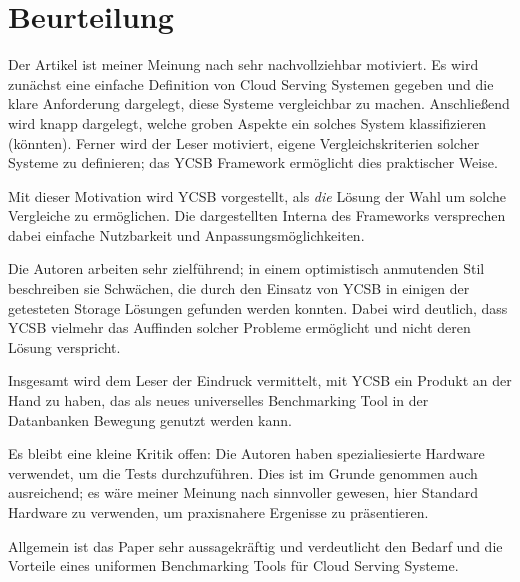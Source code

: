 \section{Beurteilung}

Der Artikel ist meiner Meinung nach sehr nachvollziehbar motiviert. Es wird zunächst eine einfache Definition von Cloud Serving Systemen gegeben und die klare Anforderung dargelegt, diese Systeme vergleichbar zu machen. Anschließend wird knapp dargelegt, welche groben Aspekte ein solches System klassifizieren (könnten). Ferner wird der Leser motiviert, eigene Vergleichskriterien solcher Systeme zu definieren; das YCSB Framework ermöglicht dies praktischer Weise.

Mit dieser Motivation wird YCSB vorgestellt, als \textit{die} Lösung der Wahl um solche Vergleiche zu ermöglichen. Die dargestellten Interna des Frameworks versprechen dabei einfache Nutzbarkeit und Anpassungsmöglichkeiten.

Die Autoren arbeiten sehr zielführend; in einem optimistisch anmutenden Stil beschreiben sie Schwächen, die durch den Einsatz von YCSB in einigen der getesteten Storage Lösungen gefunden werden konnten. Dabei wird deutlich, dass YCSB vielmehr das Auffinden solcher Probleme ermöglicht und nicht deren Lösung verspricht.

Insgesamt wird dem Leser der Eindruck vermittelt, mit YCSB ein Produkt an der Hand zu haben, das als neues universelles Benchmarking Tool in der Datanbanken Bewegung genutzt werden kann.

Es bleibt eine kleine Kritik offen: Die Autoren haben spezialiesierte Hardware verwendet, um die Tests durchzuführen. Dies ist im Grunde genommen auch ausreichend; es wäre meiner Meinung nach sinnvoller gewesen, hier Standard Hardware zu verwenden, um praxisnahere Ergenisse zu präsentieren.

Allgemein ist das Paper sehr aussagekräftig und verdeutlicht den Bedarf und die Vorteile eines uniformen Benchmarking Tools für Cloud Serving Systeme.